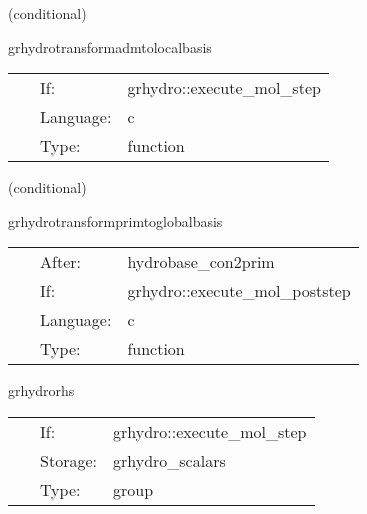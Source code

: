 \documentclass{article}
\begin{document}
   (conditional) 

\hspace{5mm} grhydrotransformadmtolocalbasis 

\hspace{5mm}{\it transform metric and shift to local tensor basis. } 


\hspace{5mm}

 \begin{tabular*}{160mm}{cll} 
~ & If:  & grhydro::execute\_mol\_step \\ 
~ & Language:  & c \\ 
~ & Type:  & function \\ 
\end{tabular*} 


\vspace{5mm}

   (conditional) 

\hspace{5mm} grhydrotransformprimtoglobalbasis 

\hspace{5mm}{\it transform primitive vars to global tensor basis. } 


\hspace{5mm}

 \begin{tabular*}{160mm}{cll} 
~ & After:  & hydrobase\_con2prim \\ 
~ & If:  & grhydro::execute\_mol\_poststep \\ 
~ & Language:  & c \\ 
~ & Type:  & function \\ 
\end{tabular*} 


\vspace{5mm}


\hspace{5mm} grhydrorhs 

\hspace{5mm}{\it calculate the update terms } 


\hspace{5mm}

 \begin{tabular*}{160mm}{cll} 
~ & If:  & grhydro::execute\_mol\_step \\ 
~ & Storage:  & grhydro\_scalars \\ 
~ & Type:  & group \\ 
\end{tabular*} 
\end{document}
